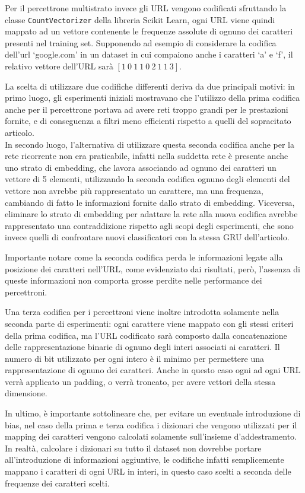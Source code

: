 \documentclass[../../main.tex]{subfiles}
\begin{document}
    Per il percettrone multistrato invece gli URL vengono codificati sfruttando la classe \texttt{CountVectorizer} della libreria Scikit Learn, ogni URL viene quindi mappato ad un vettore contenente le frequenze assolute di ognuno dei caratteri presenti nel training set. Supponendo ad esempio di considerare la codifica dell'url `google.com' in un dataset in cui compaiono anche i caratteri `a' e `f', il relativo vettore dell'URL sarà $[1 \ 0 \ 1 \ 1 \ 0 \ 2 \ 1 \ 1 \ 3]$.

    La scelta di utilizzare due codifiche differenti deriva da due principali motivi: in primo luogo, gli esperimenti iniziali mostravano che l'utilizzo della prima codifica anche per il percettrone portava ad avere reti troppo grandi per le prestazioni fornite, e di conseguenza a filtri meno efficienti rispetto a quelli del sopracitato articolo.\\
    In secondo luogo, l'alternativa di utilizzare questa seconda codifica anche per la rete ricorrente non era praticabile, infatti nella suddetta rete è presente anche uno strato di embedding, che lavora associando ad ognuno dei caratteri un vettore di 5 elementi, utilizzando la seconda codifica ognuno degli elementi del vettore non avrebbe più rappresentato un carattere, ma una frequenza, cambiando di fatto le informazioni fornite dallo strato di embedding. Viceversa, eliminare lo strato di embedding per adattare la rete alla nuova codifica avrebbe rappresentato una contraddizione rispetto agli scopi degli esperimenti, che sono invece quelli di confrontare nuovi classificatori con la stessa GRU dell'articolo.

    Importante notare come la seconda codifica perda le informazioni legate alla posizione dei caratteri nell'URL, come evidenziato dai risultati, però, l'assenza di queste informazioni non comporta grosse perdite nelle performance dei percettroni.

    Una terza codifica per i percettroni viene inoltre introdotta solamente nella seconda parte di esperimenti: ogni carattere viene mappato con gli stessi criteri della prima codifica, ma l'URL codificato sarà composto dalla concatenazione delle rappresentazione binarie di ognuno degli interi associati ai caratteri. Il numero di bit utilizzato per ogni intero è il minimo per permettere una rappresentazione di ognuno dei caratteri. Anche in questo caso ogni ad ogni URL verrà applicato un padding, o verrà troncato, per avere vettori della stessa dimensione.

    In ultimo, è importante sottolineare che, per evitare un eventuale introduzione di bias, nel caso della prima e terza codifica i dizionari che vengono utilizzati per il mapping dei caratteri vengono calcolati solamente sull'insieme d'addestramento. In realtà, calcolare i dizionari su tutto il dataset non dovrebbe portare all'introduzione di informazioni aggiuntive, le codifiche infatti semplicemente mappano i caratteri di ogni URL in interi, in questo caso scelti a seconda delle frequenze dei caratteri scelti.
\end{document}
